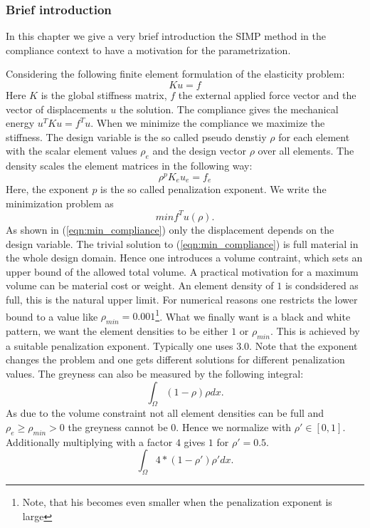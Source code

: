\subsubsection*{Brief introduction}
In this chapter we give a very brief introduction the SIMP method in the compliance
context to have a motivation for the parametrization.

Considering the following finite element formulation of the elasticity problem:
\begin{equation}
K u = f
\label{eqn:K_u_f}
\end{equation}
Here $K$ is the global stiffness matrix, $f$ the external applied force vector and
the vector of displacements $u$ the solution. The compliance gives the mechanical
energy $u^T K u = f^T u$. When we minimize the compliance we maximize the stiffness.
The design variable is the so called pseudo denstiy $\rho$ for each element with
the scalar element values $\rho_e$ and the design vector $\rho$ over all elements.
The density scales the element matrices in the following way:
\begin{equation}
\rho^p K_e u_e = f_e
\end{equation}
Here, the exponent $p$ is the so called penalization exponent. We write the
minimization problem as 
\begin{equation}
min f^T u(\rho).
\label{eqn:min_compliance}
\end{equation}
As shown in (\ref{eqn:min_compliance}) only the displacement depends on the design 
variable. The trivial solution to (\ref{eqn:min_compliance}) is full material
in the whole design domain. Hence one introduces a volume contraint, which sets
an upper bound of the allowed total volume. A practical motivation for a maximum
volume can be material cost or weight. An element density of $1$ is condsidered as full, this is the natural upper limit. For numerical reasons one restricts the lower
bound to a value like $\rho_{min} = 0.001$\footnote{Note, that his becomes even smaller when the
penalization exponent is large}. What we finally want is a black and white pattern,
we want the element densities to be either $1$ or $\rho_{min}$. This is achieved
by a suitable penalization exponent. Typically one uses $3.0$. Note that the
exponent changes the problem and one gets different solutions for different
penalization values. The greyness can also be measured by the following integral:
\begin{equation}
\int_\Omega (1 - \rho) \rho dx.
\label{eqn:greyness}
\end{equation}
As due to the volume constraint not all element densities can be full and $\rho_e \geq \rho_{min} > 0$ the greyness cannot be 0. Hence we normalize with $\rho' \in [0,1]$. Additionally multiplying with a factor $4$ gives $1$ for $\rho' = 0.5$.
\begin{equation}
\int_\Omega 4 * (1 - \rho') \rho' dx.
\label{eqn:norm_greyness}
\end{equation}

